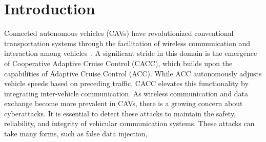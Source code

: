 \section{Introduction}
Connected autonomous vehicles (CAVs) have revolutionized conventional transportation systems through the facilitation of wireless communication and interaction among vehicles~{\cite{Bu2012}}. A significant stride in this domain is the emergence of Cooperative Adaptive Cruise Control (CACC), which builds upon the capabilities of Adaptive Cruise Control (ACC). While ACC autonomously adjusts vehicle speeds based on preceding traffic, CACC elevates this functionality by integrating inter-vehicle communication. %
%
As wireless communication and data exchange become more prevalent in CAVs, there is a growing concern about cyberattacks. It is essential to detect these attacks to maintain the safety, reliability, and integrity of vehicular communication systems. These attacks can take many forms, such as false data injection,
